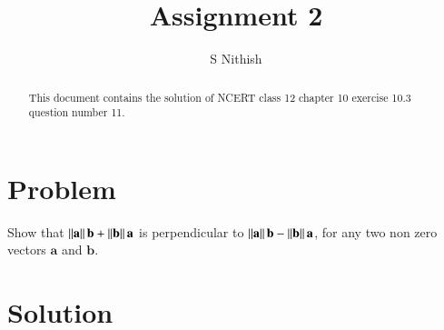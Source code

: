 \documentclass[journal,11pt,twocolumn]{IEEEtran}
\begin{document}
\let\StandardTheFigure\thefigure
\let\vec\mathbf
\renewcommand{\thefigure}{\theproblem}



\def\putbox#1#2#3{\makebox[0in][l]{\makebox[#1][l]{}\raisebox{\baselineskip}[0in][0in]{\raisebox{#2}[0in][0in]{#3}}}}
     \def\rightbox#1{\makebox[0in][r]{#1}}
     \def\centbox#1{\makebox[0in]{#1}}
     \def\topbox#1{\raisebox{-\baselineskip}[0in][0in]{#1}}
     \def\midbox#1{\raisebox{-0.5\baselineskip}[0in][0in]{#1}}

\vspace{3cm}


\title{Assignment 2}
\author{S Nithish}





\maketitle

\newpage


\bigskip

\renewcommand{\thefigure}{\theenumi}
\renewcommand{\thetable}{\theenumi}


\begin{abstract}
This document contains the solution of NCERT class 12 chapter 10 exercise 10.3 question number 11.
\end{abstract}


\section{Problem}
Show that $\norm{\vec{a}}\vec{b}+\norm{\vec{b}}\vec{a}$ is perpendicular to $\norm{\vec{a}}\vec{b}-\norm{\vec{b}}\vec{a}$, for any two non zero vectors $\vec{a}$ and $\vec{b}$.

\section{Solution}
\end{document}
